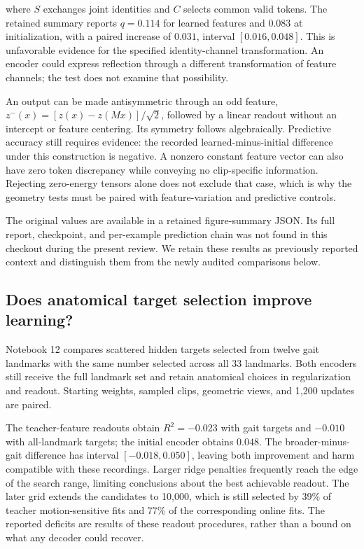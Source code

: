\documentclass{article}
\begin{document}
where \(S\) exchanges joint identities and \(C\) selects common valid tokens. The retained summary reports \(q=0.114\) for learned features and \(0.083\) at initialization, with a paired increase of \(0.031\), interval \([0.016,0.048]\). This is unfavorable evidence for the specified identity-channel transformation. An encoder could express reflection through a different transformation of feature channels; the test does not examine that possibility.

An output can be made antisymmetric through an odd feature, \(z^-(x)=[z(x)-z(Mx)]/\sqrt{2}\), followed by a linear readout without an intercept or feature centering. Its symmetry follows algebraically. Predictive accuracy still requires evidence: the recorded learned-minus-initial difference under this construction is negative. A nonzero constant feature vector can also have zero token discrepancy while conveying no clip-specific information. Rejecting zero-energy tensors alone does not exclude that case, which is why the geometry tests must be paired with feature-variation and predictive controls.

The original values are available in a retained figure-summary JSON. Its full report, checkpoint, and per-example prediction chain was not found in this checkout during the present review. We retain these results as previously reported context and distinguish them from the newly audited comparisons below.

\subsection{Does anatomical target selection improve learning?}\label{does-anatomical-target-selection-improve-learning}

Notebook 12 compares scattered hidden targets selected from twelve gait landmarks with the same number selected across all 33 landmarks. Both encoders still receive the full landmark set and retain anatomical choices in regularization and readout. Starting weights, sampled clips, geometric views, and 1,200 updates are paired.

The teacher-feature readouts obtain \(R^2=-0.023\) with gait targets and \(-0.010\) with all-landmark targets; the initial encoder obtains \(0.048\). The broader-minus-gait difference has interval \([-0.018,0.050]\), leaving both improvement and harm compatible with these recordings. Larger ridge penalties frequently reach the edge of the search range, limiting conclusions about the best achievable readout. The later grid extends the candidates to 10,000, which is still selected by 39\% of teacher motion-sensitive fits and 77\% of the corresponding online fits. The reported deficits are results of these readout procedures, rather than a bound on what any decoder could recover.
\end{document}
